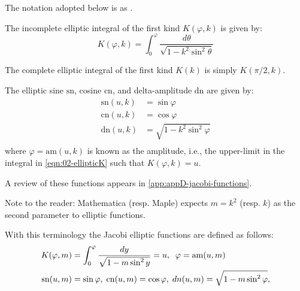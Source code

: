 The  notation adopted below is as \cite{armitage-2006}. 

\begin{definition}
The incomplete elliptic integral of the first kind $K(\varphi,k)$ is given by:
\begin{equation}
K(\varphi,k)=\int_0^{\varphi}\frac{d\theta}{\sqrt{1-k^2 \sin^2\theta}}
\label{eqn:02-ellipticK}
\end{equation}

The complete elliptic integral of the first kind $K(k)$ is simply $K(\pi/2,k)$.
\end{definition}

\begin{definition}
The elliptic sine $\text{sn}$, cosine $\text{cn}$, and delta-amplitude $\text{dn}$ are given by:
\begin{align*}
\text{sn}(u,k)&=\sin\varphi\\
\text{cn}(u,k)&=\cos\varphi\\
\text{dn}(u,k)&=\sqrt{1- k^2\sin^2\varphi}\\
\end{align*}
where $\varphi=\text{am}(u,k)$ is known as the amplitude, i.e., the upper-limit in the integral in \cref{eqn:02-ellipticK} such that $K(\varphi,k)=u$.
\end{definition}
A review of these functions appears in \cref{app:appD-jacobi-functions}.

\begin{remark}
Note to the reader: Mathematica (resp. Maple) expects $m=k^2$ (resp. $k$) as the second parameter to elliptic functions.

With this terminology the  Jacobi elliptic functions are defined    as follows:
\begin{align*}
K(\varphi,m)&=\int_0^{\varphi} \frac{dy}{\sqrt{1-m\sin^2y}}=u,\;\; \varphi=\text{am}(u,m)\\
\mathrm{sn}(u,m)&=\sin\varphi,\; \mathrm{cn}(u,m)=\cos\varphi,\; dn(u,m)=\sqrt{1-m\sin^2\varphi}, \end{align*}



\end{remark}


